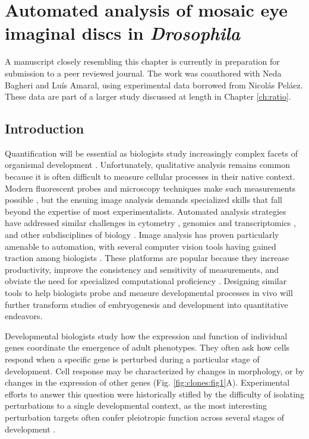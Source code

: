 
\graphicspath{ {./figures/clones/} }


\chapter{Automated analysis of mosaic eye imaginal discs in \textit{Drosophila}}
\label{ch:clones}

A manuscript closely resembling this chapter is currently in preparation for submission to a peer reviewed journal. The work was coauthored with Neda Bagheri and Lu\'{i}s Amaral, using experimental data borrowed from Nicol\'{a}s Pel\'{a}ez. These data are part of a larger study discussed at length in Chapter \ref{ch:ratio}.

\section{Introduction}

Quantification will be essential as biologists study increasingly complex facets of organismal development \cite{Oates2009}. Unfortunately, qualitative analysis remains common because it is often difficult to measure cellular processes in their native context. Modern fluorescent probes and microscopy techniques make such measurements possible \cite{Muzzey2009a,Stelzer2014,Truong2011}, but the ensuing image analysis demands specialized skills that fall beyond the expertise of most experimentalists. Automated analysis strategies have addressed similar challenges in cytometry \cite{Aghaeepour2013,Chen2015,Pyne2009}, genomics and transcriptomics \cite{Bernstein2008,Hellemans2007,Langmead2012,Trapnell2009}, and other subdisciplines of biology \cite{Costes2004,Kelley2015}. Image analysis has proven particularly amenable to automation, with several computer vision tools having gained traction among biologists \cite{Carpenter2006,Paintdakhi2016,Schindelin2012,Sommer2011}. These platforms are popular because they increase productivity, improve the consistency and sensitivity of measurements, and obviate the need for specialized computational proficiency \cite{Jug2014,Sbalzarini2016,Schindelin2015}. Designing similar tools to help biologists probe and measure developmental processes in vivo will further transform studies of embryogenesis and development into quantitative endeavors.

Developmental biologists study how the expression and function of individual genes coordinate the emergence of adult phenotypes. They often ask how cells respond when a specific gene is perturbed during a particular stage of development. Cell response may be characterized by changes in morphology, or by changes in the expression of other genes (Fig. \ref{fig:clones:fig1}A). Experimental efforts to answer this question were historically stifled by the difficulty of isolating perturbations to a single developmental context, as the most interesting perturbation targets often confer pleiotropic function across several stages of development \cite{IanSimpson2002,Parody1993,Shilo1991}. 

